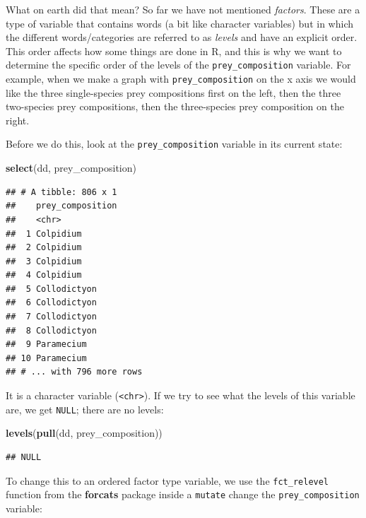 \documentclass[]{book}
\newenvironment{Shaded}{\begin{snugshade}}{\end{snugshade}}
\newcommand{\KeywordTok}[1]{\textcolor[rgb]{0.13,0.29,0.53}{\textbf{#1}}}
\newcommand{\NormalTok}[1]{#1}
\begin{document}
What on earth did that mean? So far we have not mentioned \emph{factors}. These are a type of variable that contains words (a bit like character variables) but in which the different words/categories are referred to as \emph{levels} and have an explicit order. This order affects how some things are done in R, and this is why we want to determine the specific order of the levels of the \texttt{prey\_composition} variable. For example, when we make a graph with \texttt{prey\_composition} on the x axis we would like the three single-species prey compositions first on the left, then the three two-species prey compositions, then the three-species prey composition on the right.

Before we do this, look at the \texttt{prey\_composition} variable in its current state:

\begin{Shaded}
\begin{Highlighting}[]
\KeywordTok{select}\NormalTok{(dd, prey_composition)}
\end{Highlighting}
\end{Shaded}

\begin{verbatim}
## # A tibble: 806 x 1
##    prey_composition
##    <chr>           
##  1 Colpidium       
##  2 Colpidium       
##  3 Colpidium       
##  4 Colpidium       
##  5 Collodictyon    
##  6 Collodictyon    
##  7 Collodictyon    
##  8 Collodictyon    
##  9 Paramecium      
## 10 Paramecium      
## # ... with 796 more rows
\end{verbatim}

It is a character variable (\texttt{\textless{}chr\textgreater{}}). If we try to see what the levels of this variable are, we get \texttt{NULL}; there are no levels:

\begin{Shaded}
\begin{Highlighting}[]
\KeywordTok{levels}\NormalTok{(}\KeywordTok{pull}\NormalTok{(dd, prey_composition))}
\end{Highlighting}
\end{Shaded}

\begin{verbatim}
## NULL
\end{verbatim}

To change this to an ordered factor type variable, we use the \texttt{fct\_relevel} function from the \textbf{forcats} package inside a \texttt{mutate} change the \texttt{prey\_composition} variable:
\end{document}

